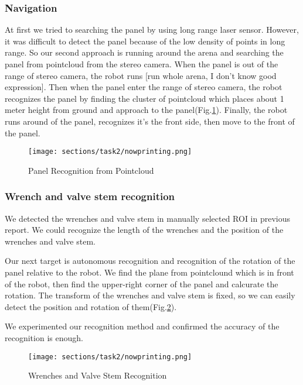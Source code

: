 \subsubsection{Navigation}
At first we tried to searching the panel by using long range laser sensor.
However, it was difficult to detect the panel because of the low density of points in long range.
So our second approach is running around the arena and searching the panel from pointcloud from the stereo camera.
When the panel is out of the range of stereo camera, the robot runs [run whole arena, I don't know good expression].
Then when the panel enter the range of stereo camera, the robot recognizes the panel by finding
the cluster of pointcloud which places about 1 meter height from ground and approach to the panel(Fig.\ref{fig: task2_panel-recognition}).
Finally, the robot runs around of the panel, recognizes it's the front side, then move to the front of the panel.

\begin{figure}[htb]
  \begin{center}
    \texttt{[image: sections/task2/nowprinting.png]}
    \caption{Panel Recognition from Pointcloud}
    \label{fig: task2_panel-recognition}
  \end{center}
\end{figure}

\subsubsection{Wrench and valve stem recognition}
We detected the wrenches and valve stem in manually selected ROI in previous report. We could recognize
the length of the wrenches and the position of the wrenches and valve stem.

Our next target is autonomous recognition and recognition of the rotation
of the panel relative to the robot.
We find the plane from pointclound which is in front of the robot, then find the upper-right corner of the panel and calcurate the rotation.
The transform of the wrenches and valve stem is fixed, so we can easily detect the position and rotation of them(Fig.\ref{fig: task2_object-recognition}).

We experimented our recognition method and confirmed the accuracy of the recognition is enough.

\begin{figure}[htb]
  \begin{center}
    \texttt{[image: sections/task2/nowprinting.png]}
    \caption{Wrenches and Valve Stem Recognition}
    \label{fig: task2_object-recognition}
  \end{center}
\end{figure}

